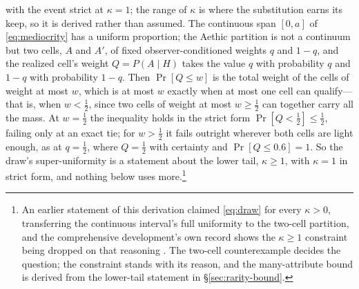 with the event strict at $\kappa = 1$; the range of $\kappa$ is where the substitution earns its keep, so it is derived rather than assumed. The continuous span $[0,a]$ of \eqref{eq:mediocrity} has a uniform proportion; the Aethic partition is not a continuum but two cells, $A$ and $A'$, of fixed observer-conditioned weights $q$ and $1-q$, and the realized cell's weight $Q = P(A \mid H)$ takes the value $q$ with probability $q$ and $1-q$ with probability $1-q$. Then $\Pr[Q \le w]$ is the total weight of the cells of weight at most $w$, which is at most $w$ exactly when at most one cell can qualify---that is, when $w < \tfrac12$, since two cells of weight at most $w \ge \tfrac12$ can together carry all the mass. At $w = \tfrac12$ the inequality holds in the strict form $\Pr[Q < \tfrac12] \le \tfrac12$, failing only at an exact tie; for $w > \tfrac12$ it fails outright wherever both cells are light enough, as at $q = \tfrac12$, where $Q = \tfrac12$ with certainty and $\Pr[Q \le 0.6] = 1$. So the draw's super-uniformity is a statement about the lower tail, $\kappa \ge 1$, with $\kappa = 1$ in strict form, and nothing below uses more.\footnote{An earlier statement of this derivation claimed \eqref{eq:draw} for every $\kappa > 0$, transferring the continuous interval's full uniformity to the two-cell partition, and the comprehensive development's own record shows the $\kappa \ge 1$ constraint being dropped on that reasoning \cite{Aethus}. The two-cell counterexample decides the question; the constraint stands with its reason, and the many-attribute bound is derived from the lower-tail statement in \S\ref{sec:rarity-bound}.}


